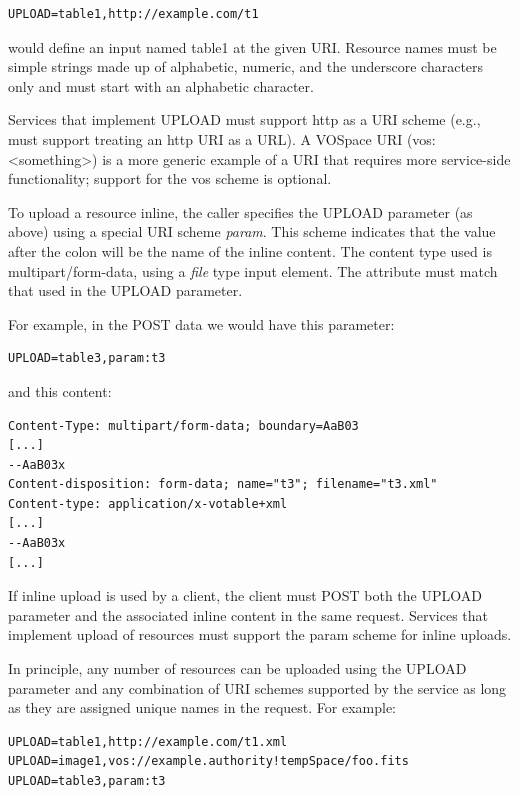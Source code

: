 \documentclass[11pt,letter]{ivoa}
\begin{document}
\begin{verbatim}
UPLOAD=table1,http://example.com/t1
\end{verbatim}

would define an input named table1 at the given URI. Resource names must be 
simple strings made up of alphabetic, numeric, and the underscore characters 
only and must start with an alphabetic character.

Services that implement UPLOAD must support http as a URI scheme (e.g., must 
support treating an http URI as a URL). A VOSpace URI (vos:<something>)  is a 
more generic example of a URI that requires more service-side functionality; 
support for the vos scheme is optional.

To upload a resource inline, the caller specifies the UPLOAD parameter (as 
above) using a special URI scheme \emph{param}. This scheme indicates that the value 
after the colon will be the name of the inline content. The content type used is 
multipart/form-data, using a \emph{file} type input element. The  attribute 
must match that used in the UPLOAD parameter.

For example, in the POST data we would have this parameter:

\begin{verbatim}
UPLOAD=table3,param:t3
\end{verbatim}

and this content:

\begin{verbatim}
Content-Type: multipart/form-data; boundary=AaB03
[...]
--AaB03x
Content-disposition: form-data; name="t3"; filename="t3.xml"
Content-type: application/x-votable+xml
[...]
--AaB03x
[...]
\end{verbatim}

If inline upload is used by a client, the client must POST both the UPLOAD 
parameter and the associated inline content in the same request. Services that 
implement upload of resources must support the param scheme for inline uploads.

In principle, any number of resources can be uploaded using the UPLOAD parameter 
and any combination of URI schemes supported by the service as long as they are 
assigned unique names in the request. For example:

\begin{verbatim}
UPLOAD=table1,http://example.com/t1.xml
UPLOAD=image1,vos://example.authority!tempSpace/foo.fits
UPLOAD=table3,param:t3
\end{verbatim}
\end{document}
